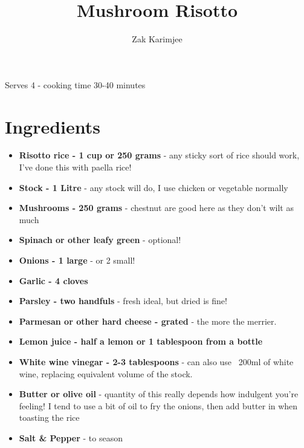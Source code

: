 \documentclass[10pt,a4paper]{article}
\begin{document}
	\title{Mushroom Risotto}
	\author{Zak Karimjee}
	\maketitle
	\begin{flushright}
		Serves 4 - cooking time 30-40 minutes
	\end{flushright}
	\section{Ingredients}
	\begin{itemize}
		\item \textbf{Risotto rice - 1 cup or 250 grams} - any sticky sort of rice should work, I've done this with paella rice!
		\item \textbf{Stock - 1 Litre} - any stock will do, I use chicken or vegetable normally
		\item \textbf{Mushrooms - 250 grams} - chestnut are good here as they don't wilt as much
		\item \textbf{Spinach or other leafy green} - optional!
		\item \textbf{Onions - 1 large} - or 2 small!
		\item \textbf{Garlic - 4 cloves}
		\item \textbf{Parsley - two handfuls} - fresh ideal, but dried is fine!
		\item \textbf{Parmesan or other hard cheese - grated} - the more the merrier.
		\item \textbf{Lemon juice - half a lemon or 1 tablespoon from a bottle}
		\item \textbf{White wine vinegar - 2-3 tablespoons} - can also use ~200ml of white wine, replacing equivalent volume of the stock.
		\item \textbf{Butter or olive oil} - quantity of this really depends how indulgent you're feeling! I tend to use a bit of oil to fry the onions, then add butter in when toasting the rice
		\item \textbf{Salt \& Pepper} - to season
	\end{itemize}
\end{document}
